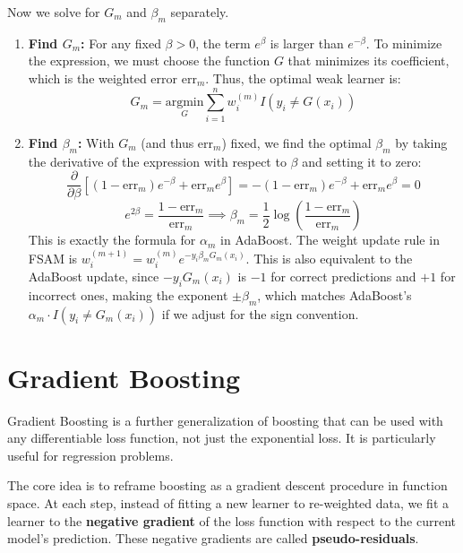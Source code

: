 \documentclass{article}
\begin{document}
\begin{multicols}{2}
Now we solve for $G_m$ and $\beta_m$ separately.
\begin{enumerate}
    \item \textbf{Find $G_m$:} For any fixed $\beta > 0$, the term $e^{\beta}$ is larger than $e^{-\beta}$. To minimize the expression, we must choose the function $G$ that minimizes its coefficient, which is the weighted error $\text{err}_m$. Thus, the optimal weak learner is:
    $$ G_m = \underset{G}{\text{argmin}} \sum_{i=1}^{n} w_i^{(m)} I(y_i \neq G(x_i)) $$
    \item \textbf{Find $\beta_m$:} With $G_m$ (and thus $\text{err}_m$) fixed, we find the optimal $\beta_m$ by taking the derivative of the expression with respect to $\beta$ and setting it to zero:
    $$ \frac{\partial}{\partial \beta} [ (1 - \text{err}_m) e^{-\beta} + \text{err}_m e^{\beta} ] = -(1 - \text{err}_m) e^{-\beta} + \text{err}_m e^{\beta} = 0 $$
    $$ e^{2\beta} = \frac{1 - \text{err}_m}{\text{err}_m} \implies \beta_m = \frac{1}{2} \log\left(\frac{1 - \text{err}_m}{\text{err}_m}\right) $$
    This is exactly the formula for $\alpha_m$ in AdaBoost. The weight update rule in FSAM is $w_i^{(m+1)} = w_i^{(m)} e^{-y_i \beta_m G_m(x_i)}$. This is also equivalent to the AdaBoost update, since $-y_i G_m(x_i)$ is $-1$ for correct predictions and $+1$ for incorrect ones, making the exponent $\pm \beta_m$, which matches AdaBoost's $\alpha_m \cdot I(y_i \neq G_m(x_i))$ if we adjust for the sign convention.
\end{enumerate}

\section{Gradient Boosting}
Gradient Boosting is a further generalization of boosting that can be used with any differentiable loss function, not just the exponential loss. It is particularly useful for regression problems.

The core idea is to reframe boosting as a gradient descent procedure in function space. At each step, instead of fitting a new learner to re-weighted data, we fit a learner to the \textbf{negative gradient} of the loss function with respect to the current model's prediction. These negative gradients are called \textbf{pseudo-residuals}.


\end{multicols}
\end{document}
